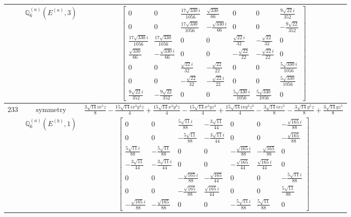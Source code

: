 \documentclass[fleqn,8pt,landscape]{jsarticle}
\begin{document}
\begin{longtable}{ccc}
$  $ & $ \mathbb{Q}_{6}^{(a)}(E^{(a)},3) $ & $ \begin{bmatrix} 0 & 0 & \frac{17 \sqrt{330} i}{1056} & \frac{\sqrt{330}}{66} & 0 & 0 & \frac{9 \sqrt{22} i}{352} \\ 0 & 0 & \frac{17 \sqrt{330}}{1056} & - \frac{\sqrt{330} i}{66} & 0 & 0 & - \frac{9 \sqrt{22}}{352} \\ \frac{17 \sqrt{330} i}{1056} & \frac{17 \sqrt{330}}{1056} & 0 & 0 & \frac{\sqrt{22} i}{32} & - \frac{\sqrt{22}}{32} & 0 \\ \frac{\sqrt{330}}{66} & - \frac{\sqrt{330} i}{66} & 0 & 0 & - \frac{\sqrt{22}}{22} & - \frac{\sqrt{22} i}{22} & 0 \\ 0 & 0 & \frac{\sqrt{22} i}{32} & - \frac{\sqrt{22}}{22} & 0 & 0 & \frac{5 \sqrt{330} i}{1056} \\ 0 & 0 & - \frac{\sqrt{22}}{32} & - \frac{\sqrt{22} i}{22} & 0 & 0 & \frac{5 \sqrt{330}}{1056} \\ \frac{9 \sqrt{22} i}{352} & - \frac{9 \sqrt{22}}{352} & 0 & 0 & \frac{5 \sqrt{330} i}{1056} & \frac{5 \sqrt{330}}{1056} & 0 \end{bmatrix} $ \\ \hline
$ 233 $ & $ \text{symmetry} $ & $ \frac{3 \sqrt{14} i x^{5} z}{8} - \frac{15 \sqrt{14} i x^{3} y^{2} z}{4} + \frac{15 \sqrt{14} x^{2} y^{3} z}{4} - \frac{15 \sqrt{14} x^{2} y z^{3}}{4} + \frac{15 \sqrt{14} i x y^{2} z^{3}}{4} - \frac{3 \sqrt{14} i x z^{5}}{8} - \frac{3 \sqrt{14} y^{5} z}{8} + \frac{3 \sqrt{14} y z^{5}}{8} $ \\
$  $ & $ \mathbb{Q}_{6}^{(a)}(E^{(b)},1) $ & $ \begin{bmatrix} 0 & 0 & \frac{5 \sqrt{11} i}{88} & - \frac{3 \sqrt{11}}{44} & 0 & 0 & - \frac{\sqrt{165} i}{88} \\ 0 & 0 & - \frac{5 \sqrt{11}}{88} & - \frac{3 \sqrt{11} i}{44} & 0 & 0 & - \frac{\sqrt{165}}{88} \\ \frac{5 \sqrt{11} i}{88} & - \frac{5 \sqrt{11}}{88} & 0 & 0 & - \frac{\sqrt{165} i}{88} & - \frac{\sqrt{165}}{88} & 0 \\ - \frac{3 \sqrt{11}}{44} & - \frac{3 \sqrt{11} i}{44} & 0 & 0 & - \frac{\sqrt{165}}{44} & \frac{\sqrt{165} i}{44} & 0 \\ 0 & 0 & - \frac{\sqrt{165} i}{88} & - \frac{\sqrt{165}}{44} & 0 & 0 & - \frac{5 \sqrt{11} i}{88} \\ 0 & 0 & - \frac{\sqrt{165}}{88} & \frac{\sqrt{165} i}{44} & 0 & 0 & \frac{5 \sqrt{11}}{88} \\ - \frac{\sqrt{165} i}{88} & - \frac{\sqrt{165}}{88} & 0 & 0 & - \frac{5 \sqrt{11} i}{88} & \frac{5 \sqrt{11}}{88} & 0 \end{bmatrix} $ \\ \hline

\end{longtable}
\end{document}
